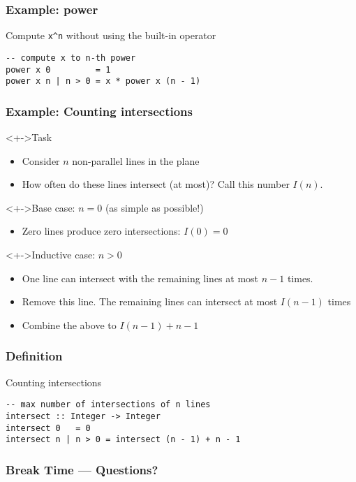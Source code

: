 \documentclass{beamer}
\begin{document}
\begin{frame}[fragile]
  \frametitle{Example: power}
  Compute \verb|x^n| without using the built-in operator
\begin{verbatim}
-- compute x to n-th power
power x 0         = 1
power x n | n > 0 = x * power x (n - 1)
\end{verbatim}
\end{frame}

\begin{frame}
  \frametitle{Example: Counting intersections}
  \begin{block}<+->{Task}
    \begin{itemize}
    \item Consider $n$ non-parallel lines in the plane
    \item How often do these lines intersect (at most)? Call this
      number $I (n)$.
    \end{itemize}
  \end{block}
  \begin{block}<+->{Base case: $n=0$ (as simple as possible!)}
    \begin{itemize}
    \item<+-> Zero lines produce zero intersections: $I(0) = 0$
    \end{itemize}
  \end{block}
  \begin{block}<+->{Inductive case: $n>0$}
    \begin{itemize}
    \item<+-> One line can intersect with the remaining
      lines at most $n-1$ times.
    \item<+-> Remove this line. The remaining lines can intersect at
      most $I (n-1)$ times
    \item<+-> Combine the above to $I (n-1) + n-1$
    \end{itemize}
  \end{block}
\end{frame}
\begin{frame}[fragile]
  \frametitle{Definition}
  \begin{block}{Counting intersections}
\begin{verbatim}
-- max number of intersections of n lines
intersect :: Integer -> Integer
intersect 0   = 0
intersect n | n > 0 = intersect (n - 1) + n - 1
\end{verbatim}
  \end{block}
\end{frame}

\begin{frame}
  \frametitle{Break Time --- Questions?}
  \begin{center}
  \end{center}
\end{frame}
\end{document}
